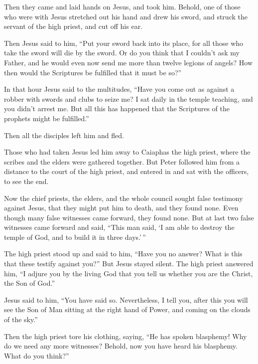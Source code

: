 Then they came and laid hands on Jesus, and took him. 
Behold, one of those who were with Jesus stretched out his hand and drew
his sword, and struck the servant of the high priest, and cut off his
ear.

 Then Jesus said to him, ``Put your sword back into its
place, for all those who take the sword will die by the sword.
 Or do you think that I couldn't ask my Father, and he
would even now send me more than twelve legions of angels? 
How then would the Scriptures be fulfilled that it must be so?''

 In that hour Jesus said to the multitudes, ``Have you come
out as against a robber with swords and clubs to seize me? I sat daily
in the temple teaching, and you didn't arrest me.  But all
this has happened that the Scriptures of the prophets might be
fulfilled.''

Then all the disciples left him and fled.

 Those who had taken Jesus led him away to Caiaphas the
high priest, where the scribes and the elders were gathered together.
 But Peter followed him from a distance to the court of the
high priest, and entered in and sat with the officers, to see the end.

 Now the chief priests, the elders, and the whole council
sought false testimony against Jesus, that they might put him to death,
 and they found none. Even though many false witnesses came
forward, they found none. But at last two false witnesses came forward
 and said, ``This man said, `I am able to destroy the
temple of God, and to build it in three days.'\,''

 The high priest stood up and said to him, ``Have you no
answer? What is this that these testify against you?''  But
Jesus stayed silent. The high priest answered him, ``I adjure you by the
living God that you tell us whether you are the Christ, the Son of
God.''

 Jesus said to him, ``You have said so. Nevertheless, I
tell you, after this you will see the Son of Man sitting at the right
hand of Power, and coming on the clouds of the sky.''

 Then the high priest tore his clothing, saying, ``He has
spoken blasphemy! Why do we need any more witnesses? Behold, now you
have heard his blasphemy.  What do you think?''

